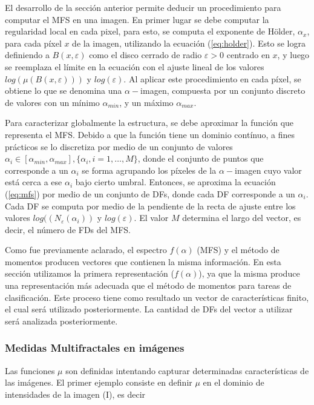 El desarrollo de la sección anterior permite deducir un procedimiento para computar el MFS en una imagen.
En primer lugar se debe computar la regularidad local en cada pixel, para esto, se computa el exponente de H\"older, $\alpha_{x}$, para cada píxel $x$ de la imagen, utilizando la ecuación (\ref{eq:holder}).
Esto se logra definiendo a $B(x,\varepsilon)$ como el disco cerrado de radio $\varepsilon > 0$ centrado en $x$, y luego se reemplaza el límite en la ecuación con el ajuste lineal de los valores $log(\mu(B(x,\varepsilon)))$ y $log(\varepsilon)$.
Al aplicar este procedimiento en cada píxel, se obtiene lo que se denomina una $\alpha-$imagen, compuesta por un conjunto discreto de valores con un mínimo $\alpha_{min}$, y un máximo $\alpha_{max}$.

Para caracterizar globalmente la estructura, se debe aproximar la función que representa el MFS.
Debido a que la función tiene un dominio contínuo, a fines prácticos se lo discretiza por medio de un conjunto de valores $\alpha_{i} \in [\alpha_{min},\alpha_{max}], \{\alpha_{i}, i = 1,\dots,M\}$, donde el conjunto de puntos que corresponde a un $\alpha_{i}$ se forma agrupando los píxeles de la $\alpha-$imagen cuyo valor está cerca a ese $\alpha_{i}$ bajo cierto umbral. 
Entonces, se aproxima la ecuación (\ref{eq:mfs}) por medio de un conjunto de DFs, donde cada DF corresponde a un $\alpha_{i}$.
Cada DF se computa por medio de la pendiente de la recta de ajuste entre los valores $log((N_{\varepsilon}(\alpha_{i}))$ y $log(\varepsilon)$. 
El valor $M$ determina el largo del vector, es decir, el número de FDs del MFS.

Como fue previamente aclarado, el espectro $f(\alpha)$ (MFS) y el método de momentos producen vectores que contienen la misma información.
En esta sección utilizamos la primera representación ($f(\alpha)$), ya que la misma produce una representación más adecuada que el método de momentos para tareas de clasificación.
Este proceso tiene como resultado un vector de características finito, el cual será utilizado posteriormente.
La cantidad de DFs del vector a utilizar será analizada posteriormente.


\subsubsection{Medidas Multifractales en imágenes}
\label{sec:mfsmeasures}
Las funciones $\mu$ son definidas intentando capturar determinadas características de las imágenes.
El primer ejemplo consiste en definir $\mu$ en el dominio de intensidades de la imagen (I), es decir

